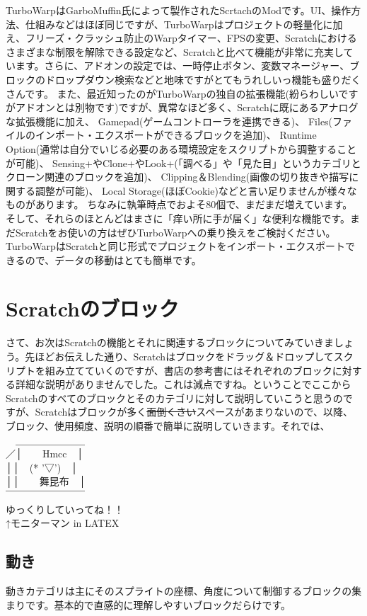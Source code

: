 \documentclass[b5paper,10pt]{jsarticle}
\begin{document}
\begin{multicols*}{3}
TurboWarpはGarboMuffin氏によって製作されたScrtachのModです。UI、操作方法、仕組みなどはほぼ同じですが、TurboWarpはプロジェクトの軽量化に加え、フリーズ・クラッシュ防止のWarpタイマー、FPSの変更、Scratchにおけるさまざまな制限を解除できる設定など、Scratchと比べて機能が非常に充実しています。さらに、アドオンの設定では、一時停止ボタン、変数マネージャー、ブロックのドロップダウン検索などと地味ですがとてもうれしいっ機能も盛りだくさんです。
また、最近知ったのがTurboWarpの独自の拡張機能(紛らわしいですがアドオンとは別物です)ですが、異常なほど多く、Scratchに既にあるアナログな拡張機能に加え、
Gamepad(ゲームコントローラを連携できる)、
Files(ファイルのインポート・エクスポートができるブロックを追加)、
Runtime Option(通常は自分でいじる必要のある環境設定をスクリプトから調整することが可能)、
Sensing+やClone+やLook+(「調べる」や「見た目」というカテゴリとクローン関連のブロックを追加)、
Clipping＆Blending(画像の切り抜きや描写に関する調整が可能)、
Local Storage(ほぼCookie)などと言い足りませんが様々なものがあります。
ちなみに執筆時点でおよそ80個で、まだまだ増えています。
そして、それらのほとんどはまさに「痒い所に手が届く」な便利な機能です。まだScratchをお使いの方はぜひTurboWarpへの乗り換えをご検討ください。TurboWarpはScratchと同じ形式でプロジェクトをインポート・エクスポートできるので、データの移動はとても簡単です。

\section{Scratchのブロック}

さて、お次はScratchの機能とそれに関連するブロックについてみていきましょう。先ほどお伝えした通り、Scratchはブロックをドラッグ＆ドロップしてスクリプトを組み立てていくのですが、書店の参考書にはそれぞれのブロックに対する詳細な説明がありませんでした。これは減点ですね。ということでここからScratchのすべてのブロックとそのカテゴリに対して説明していこうと思うのですが、Scratchはブロックが多く\sout{面倒くさい}スペースがあまりないので、以降、ブロック、使用頻度、説明の順番で簡単に説明していきます。それでは、\\
　＿＿＿＿＿＿＿\\
／│　　Hmcc　│\\
││　(* '▽')　│\\
││　　舞昆布　│\\
￣￣￣￣￣￣￣￣\\
ゆっくりしていってね！！\\
↑モニターマン in LATEX

\pagebreak
\subsection{動き}
動きカテゴリは主にそのスプライトの座標、角度について制御するブロックの集まりです。基本的で直感的に理解しやすいブロックだらけです。


\end{multicols*}
\end{document}
